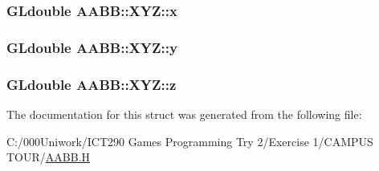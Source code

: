\subsubsection[{\texorpdfstring{x}{x}}]{\setlength{\rightskip}{0pt plus 5cm}G\+Ldouble A\+A\+B\+B\+::\+X\+Y\+Z\+::x}\hypertarget{struct_a_a_b_b_1_1_x_y_z_ae8cfad188494bd7f2e3f6ef7d166e33c}{}\label{struct_a_a_b_b_1_1_x_y_z_ae8cfad188494bd7f2e3f6ef7d166e33c}
\subsubsection[{\texorpdfstring{y}{y}}]{\setlength{\rightskip}{0pt plus 5cm}G\+Ldouble A\+A\+B\+B\+::\+X\+Y\+Z\+::y}\hypertarget{struct_a_a_b_b_1_1_x_y_z_a5ad8f1a60153a4c3fd58a60a06a5100d}{}\label{struct_a_a_b_b_1_1_x_y_z_a5ad8f1a60153a4c3fd58a60a06a5100d}
\subsubsection[{\texorpdfstring{z}{z}}]{\setlength{\rightskip}{0pt plus 5cm}G\+Ldouble A\+A\+B\+B\+::\+X\+Y\+Z\+::z}\hypertarget{struct_a_a_b_b_1_1_x_y_z_a6601b017a897d082c777cd6f08af2399}{}\label{struct_a_a_b_b_1_1_x_y_z_a6601b017a897d082c777cd6f08af2399}


The documentation for this struct was generated from the following file\+:\begin{DoxyCompactItemize}
\item 
C\+:/000\+Uniwork/\+I\+C\+T290 Games Programming Try 2/\+Exercise 1/\+C\+A\+M\+P\+U\+S T\+O\+U\+R/\hyperlink{_a_a_b_b_8_h}{A\+A\+B\+B.\+H}\end{DoxyCompactItemize}
